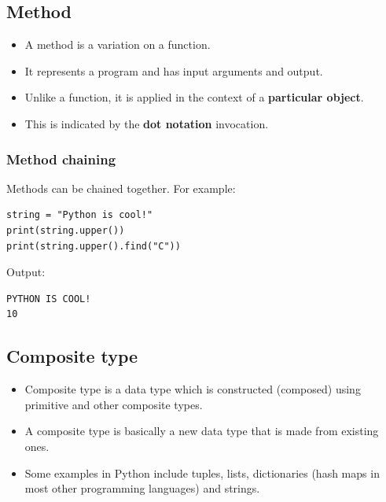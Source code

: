 \documentclass[11pt]{article}
\begin{document}
\subsection{Method}
\label{sec:org2e17d22}
\begin{itemize}
\item A method is a variation on a function.
\item It represents a program and has input arguments and output.
\item Unlike a function, it is applied in the context of a \textbf{particular object}.
\item This is indicated by the \textbf{dot notation} invocation.
\end{itemize}

\subsubsection{Method chaining}
\label{sec:orgd4e16f9}
Methods can be chained together. For example:
\begin{verbatim}
string = "Python is cool!"
print(string.upper())
print(string.upper().find("C"))
\end{verbatim}

 \noindent Output:

\begin{verbatim}
PYTHON IS COOL!
10
\end{verbatim}

\subsection{Composite type}
\label{sec:orgf8c9601}
\begin{itemize}
\item Composite type is a data type which is constructed (composed) using primitive and other composite types.
\item A composite type is basically a new data type that is made from existing ones.
\item Some examples in Python include tuples, lists, dictionaries (hash maps in most other programming languages) and strings.
\end{itemize}
\end{document}
